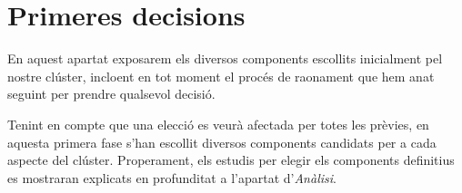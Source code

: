 \section{Primeres decisions}

En aquest apartat exposarem els diversos components escollits inicialment pel nostre clúster, incloent en tot moment el procés de raonament que hem anat seguint per prendre qualsevol decisió. 

Tenint en compte que una elecció es veurà afectada per totes les prèvies, en aquesta primera fase s'han escollit diversos components candidats per a cada aspecte del clúster. Properament, els estudis per elegir els components definitius es mostraran explicats en profunditat a l'apartat d'\textit{Anàlisi}.











